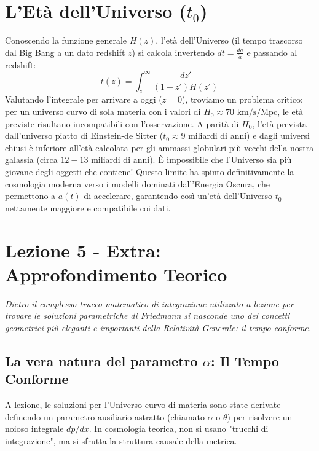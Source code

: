 \documentclass[11pt,a4paper]{report}
\begin{document}
\section{L'Età dell'Universo ($t_0$)}
Conoscendo la funzione generale $H(z)$, l'età dell'Universo (il tempo trascorso dal Big Bang a un dato redshift $z$) si calcola invertendo $dt = \frac{da}{\dot{a}}$ e passando al redshift:
\begin{equation}
t(z) = \int_z^\infty \frac{dz'}{(1+z') H(z')}
\end{equation}
Valutando l'integrale per arrivare a oggi ($z=0$), troviamo un problema critico: per un universo curvo di sola materia con i valori di $H_0 \approx 70 \text{ km/s/Mpc}$, le età previste risultano incompatibili con l'osservazione. A parità di $H_0$, l'età prevista dall'universo piatto di Einstein-de Sitter ($t_0 \approx 9$ miliardi di anni) e dagli universi chiusi è inferiore all'età calcolata per gli ammassi globulari più vecchi della nostra galassia (circa $12-13$ miliardi di anni). È impossibile che l'Universo sia più giovane degli oggetti che contiene! 
Questo limite ha spinto definitivamente la cosmologia moderna verso i modelli dominati dall'Energia Oscura, che permettono a $a(t)$ di accelerare, garantendo così un'età dell'Universo $t_0$ nettamente maggiore e compatibile coi dati.


\newpage
\section{Lezione 5 - Extra: Approfondimento Teorico}

\textit{Dietro il complesso trucco matematico di integrazione utilizzato a lezione per trovare le soluzioni parametriche di Friedmann si nasconde uno dei concetti geometrici più eleganti e importanti della Relatività Generale: il tempo conforme.}

\subsection{La vera natura del parametro $\alpha$: Il Tempo Conforme}
A lezione, le soluzioni per l'Universo curvo di materia sono state derivate definendo un parametro ausiliario astratto (chiamato $\alpha$ o $\theta$) per risolvere un noioso integrale $dp/dx$. In cosmologia teorica, non si usano "trucchi di integrazione", ma si sfrutta la struttura causale della metrica.
\end{document}

